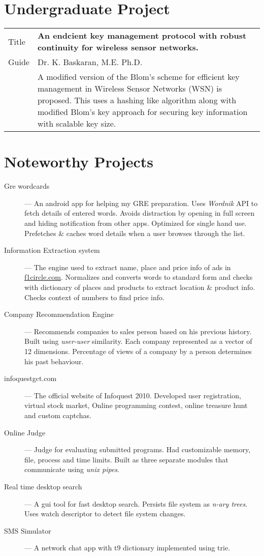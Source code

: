 \documentclass{resume}
\begin{document}
\section{Undergraduate Project}
\begin{tabular}{l p{5.6in}}
  Title & \textbf{An endcient key management protocol with robust continuity for wireless sensor networks.}\\
  Guide & Dr. K. Baskaran, M.E. Ph.D.\\
        & A modified version of the Blom's scheme for efficient key management in Wireless Sensor Networks (WSN) is proposed.  This uses a hashing like algorithm along with modified Blom's key approach for securing key information with scalable key size.
\end{tabular}

\section{Noteworthy Projects}
\begin{description}
  \item[Gre wordcards] --- An android app for helping my GRE preparation.  Uses \textit{Wordnik} API to fetch details of entered words.  Avoids distraction by opening in full screen and hiding notification from other apps. Optimized for single hand use.  Prefetches \& caches word details when a user browses through the list.
  \item[Information Extraction system] --- The engine used to extract name, place and price info of ads in \url{f1circle.com}.  Normalizes and converts words to standard form and checks with dictionary of places and products to extract location \& product info.  Checks context of numbers to find price info.
  \item[Company Recommendation Engine] --- Recommends companies to sales person based on his previous history.  Built using \textit{user-user} similarity. Each company represented as a vector of 12 dimensions.  Percentage of views of a company by a person determines his past behaviour.
  \item[infoquestgct.com] --- The official website of Infoquest 2010. Developed user registration, virtual stock market, Online programming contest, online treasure hunt and custom captchas.
  \item[Online Judge] --- Judge for evaluating submitted programs.  Had customizable memory, file, process and time limits. Built as three separate modules that communicate using \textit{unix pipes}.
  \item[Real time desktop search] --- A gui tool for fast desktop search.  Persists file system as \textit{n-ary trees.} Uses watch descriptor to detect file system changes.
  \item[SMS Simulator] --- A network chat app with t9 dictionary implemented using trie.
\end{description}
\end{document}
